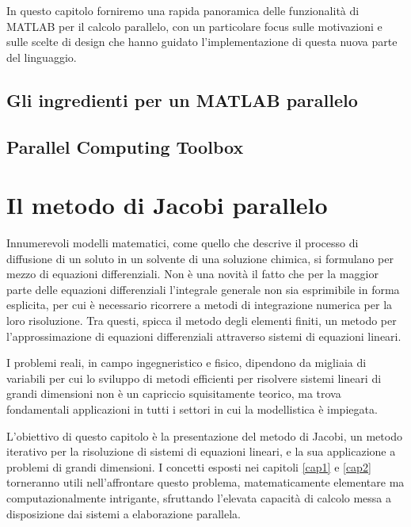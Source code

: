 \documentclass[
	a4paper,
	twoside,
	12pt
]{book}
\theoremstyle{teorema}
\theoremstyle{stileEsempio}
\begin{document}
In questo capitolo forniremo una rapida panoramica delle funzionalit\`a di MATLAB per il calcolo parallelo,
con un particolare focus sulle motivazioni e sulle scelte di design che hanno guidato l'implementazione di questa nuova parte del linguaggio.
\section{Gli ingredienti per un MATLAB parallelo}
\label{par2.1}

\section{Parallel Computing Toolbox}
\label{par2.2}

\chapter{Il metodo di Jacobi parallelo}
\label{cap3}
Innumerevoli modelli matematici, come quello che descrive il processo di diffusione di un soluto in un solvente di una soluzione chimica, si formulano per mezzo di equazioni 
differenziali. \newline
Non \`e una novit\`a il fatto che per la maggior parte delle equazioni differenziali l'integrale generale non sia esprimibile in forma esplicita, per cui \`e 
necessario ricorrere a metodi di integrazione numerica per la loro risoluzione.\newline
Tra questi, spicca il metodo degli elementi finiti, un metodo per l'approssimazione di equazioni differenziali 
attraverso sistemi di equazioni lineari.

I problemi reali, in campo ingegneristico e fisico, dipendono da migliaia di variabili per cui lo sviluppo di metodi efficienti per risolvere sistemi lineari di grandi 
dimensioni non \`e un capriccio squisitamente teorico, ma trova fondamentali applicazioni in tutti i settori in cui la modellistica \`e impiegata.

L'obiettivo di questo capitolo \`e la presentazione del metodo di Jacobi, un metodo iterativo per la risoluzione di sistemi di equazioni lineari, e la sua 
applicazione a problemi di grandi dimensioni.\newline
I concetti esposti nei capitoli \ref{cap1} e \ref{cap2} torneranno utili nell'affrontare questo problema, matematicamente elementare ma computazionalmente 
intrigante, sfruttando l'elevata capacit\`a di calcolo messa a disposizione dai sistemi a elaborazione parallela.
\end{document}
